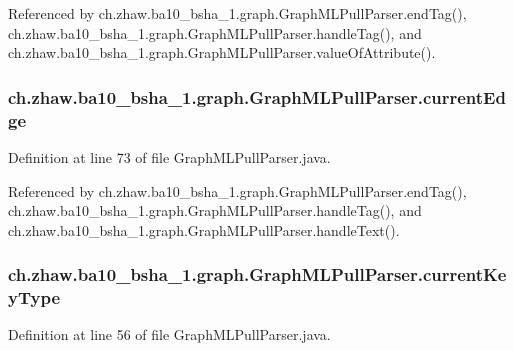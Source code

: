 Referenced by ch.zhaw.ba10\_\-bsha\_\-1.graph.GraphMLPullParser.endTag(), ch.zhaw.ba10\_\-bsha\_\-1.graph.GraphMLPullParser.handleTag(), and ch.zhaw.ba10\_\-bsha\_\-1.graph.GraphMLPullParser.valueOfAttribute().\hypertarget{classch_1_1zhaw_1_1ba10__bsha__1_1_1graph_1_1GraphMLPullParser_aa293c98ba213a9cbe6f6f48c82f5b706}{
\subsubsection[{currentEdge}]{ {\bf ch.zhaw.ba10\_\-bsha\_\-1.graph.GraphMLPullParser.currentEdge}}}
\label{classch_1_1zhaw_1_1ba10__bsha__1_1_1graph_1_1GraphMLPullParser_aa293c98ba213a9cbe6f6f48c82f5b706}


Definition at line 73 of file GraphMLPullParser.java.

Referenced by ch.zhaw.ba10\_\-bsha\_\-1.graph.GraphMLPullParser.endTag(), ch.zhaw.ba10\_\-bsha\_\-1.graph.GraphMLPullParser.handleTag(), and ch.zhaw.ba10\_\-bsha\_\-1.graph.GraphMLPullParser.handleText().\hypertarget{classch_1_1zhaw_1_1ba10__bsha__1_1_1graph_1_1GraphMLPullParser_a5a312256806488a510dd5bc2f67535c0}{
\subsubsection[{currentKeyType}]{ {\bf ch.zhaw.ba10\_\-bsha\_\-1.graph.GraphMLPullParser.currentKeyType}}}
\label{classch_1_1zhaw_1_1ba10__bsha__1_1_1graph_1_1GraphMLPullParser_a5a312256806488a510dd5bc2f67535c0}


Definition at line 56 of file GraphMLPullParser.java.

